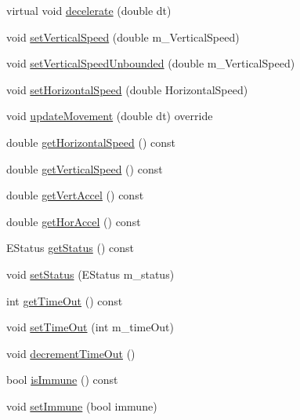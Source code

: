 \begin{DoxyCompactItemize}
\item 
virtual void \hyperlink{classroadfighter_1_1MovingObject_a8183bcad61477b6cba13b70d6dbf6b84}{decelerate} (double dt)
\item 
void \hyperlink{classroadfighter_1_1MovingObject_a7382aeb5c2e7254dde2cc571c85a8fbb}{set\+Vertical\+Speed} (double m\+\_\+\+Vertical\+Speed)
\item 
void \hyperlink{classroadfighter_1_1MovingObject_a9aa56ab17060aabcae8604633993323f}{set\+Vertical\+Speed\+Unbounded} (double m\+\_\+\+Vertical\+Speed)
\item 
void \hyperlink{classroadfighter_1_1MovingObject_a20321fab6dfee452486f80d744d7002d}{set\+Horizontal\+Speed} (double Horizontal\+Speed)
\item 
void \hyperlink{classroadfighter_1_1MovingObject_ac1918d96dac118c4bd7d99168d92867c}{update\+Movement} (double dt) override
\item 
double \hyperlink{classroadfighter_1_1MovingObject_a26e23531dea4a66777f7a3fd61fa4a21}{get\+Horizontal\+Speed} () const
\item 
double \hyperlink{classroadfighter_1_1MovingObject_a50a29cec3ac0234325691f2efd0e7fe1}{get\+Vertical\+Speed} () const
\item 
double \hyperlink{classroadfighter_1_1MovingObject_a299e4d456864595ba066c89f7de58afe}{get\+Vert\+Accel} () const
\item 
double \hyperlink{classroadfighter_1_1MovingObject_a00ed8d1d735142a802792954089e2081}{get\+Hor\+Accel} () const
\item 
E\+Status \hyperlink{classroadfighter_1_1MovingObject_a05cbcd45fb2827a26f54500a897862b4}{get\+Status} () const
\item 
void \hyperlink{classroadfighter_1_1MovingObject_ab1f380b45e20697c45b6ed7b466ca0e9}{set\+Status} (E\+Status m\+\_\+status)
\item 
int \hyperlink{classroadfighter_1_1MovingObject_a447e1cfbdca177040016cd25f736d7df}{get\+Time\+Out} () const
\item 
void \hyperlink{classroadfighter_1_1MovingObject_a3e0c64a4f67f03e84fc388127123c2df}{set\+Time\+Out} (int m\+\_\+time\+Out)
\item 
void \hyperlink{classroadfighter_1_1MovingObject_aa968b69523ee3cfe64fcd5342732ba5a}{decrement\+Time\+Out} ()
\item 
bool \hyperlink{classroadfighter_1_1MovingObject_a25573bdb03d697a1ea65e207a9ff471a}{is\+Immune} () const
\item 
void \hyperlink{classroadfighter_1_1MovingObject_a4b37b0c2ab03b681e9515db6f029186f}{set\+Immune} (bool immune)

\end{DoxyCompactItemize}
